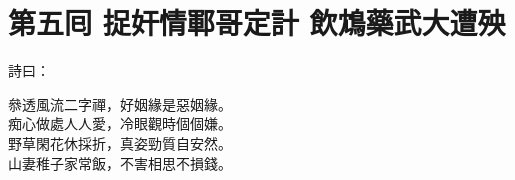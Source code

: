 
\chapter*{第五囘 捉奸情鄆哥定計 飲鴆藥武大遭殃}


詩曰：

\begin{myquote} 
叅透風流二字禪，好姻緣是惡姻緣。\\痴心做處人人愛，冷眼觀時個個嫌。\\野草閑花休採折，真姿勁質自安然。\\山妻稚子家常飯，不害相思不損錢。
\end{myquote} 

